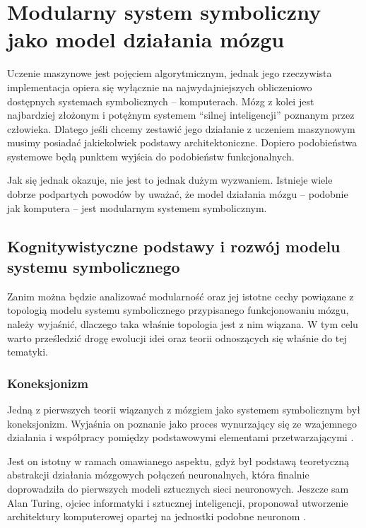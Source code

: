 \chapter{Modularny system symboliczny jako model działania mózgu}
\label{ch:modularity}

Uczenie maszynowe jest pojęciem algorytmicznym, jednak jego rzeczywista implementacja opiera się wyłącznie na najwydajniejszych obliczeniowo dostępnych systemach symbolicznych -- komputerach.
Mózg z kolei jest najbardziej złożonym i potężnym systemem ``silnej inteligencji'' poznanym przez człowieka.
Dlatego jeśli chcemy zestawić jego działanie z uczeniem maszynowym musimy posiadać jakiekolwiek podstawy architektoniczne.
Dopiero podobieństwa systemowe będą punktem wyjścia do podobieństw funkcjonalnych.

Jak się jednak okazuje, nie jest to jednak dużym wyzwaniem.
Istnieje wiele dobrze podpartych powodów by uważać, że model działania mózgu -- podobnie jak komputera -- jest modularnym systemem symbolicznym.

\section{Kognitywistyczne podstawy i rozwój modelu systemu symbolicznego}
\label{cognitive-basics}

Zanim można będzie analizować modularność oraz jej istotne cechy powiązane z topologią modelu systemu symbolicznego przypisanego funkcjonowaniu mózgu, należy wyjaśnić, dlaczego taka właśnie topologia jest z nim wiązana.
W tym celu warto prześledzić drogę ewolucji idei oraz teorii odnoszących się właśnie do tej tematyki.

\subsection{Koneksjonizm}

Jedną z pierwszych teorii wiązanych z mózgiem jako systemem symbolicznym był koneksjonizm.
Wyjaśnia on poznanie jako proces wynurzający się ze wzajemnego działania i współpracy pomiędzy podstawowymi elementami przetwarzającymi \cite{bechtel1993case}.

Jest on istotny w ramach omawianego aspektu, gdyż był podstawą teoretyczną abstrakcji działania mózgowych połączeń neuronalnych, która finalnie doprowadziła do pierwszych modeli sztucznych sieci neuronowych.
Jeszcze sam Alan Turing, ojciec informatyki i sztucznej inteligencji, proponował utworzenie architektury komputerowej opartej na jednostki podobne neuronom \cite{copeland1996alan}.

